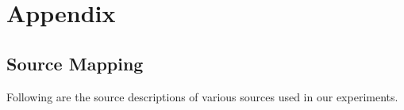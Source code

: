 
\appendix
\chapter{Appendix}

\section{Source Mapping}

Following are the source descriptions of various sources used in our experiments.

